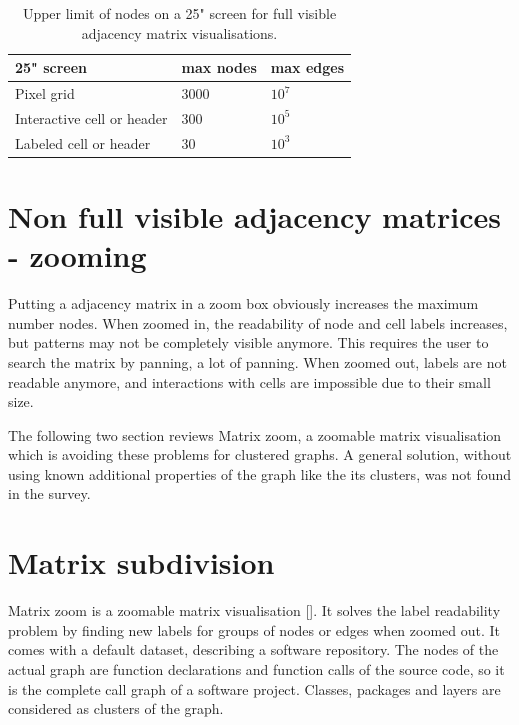  
\begin{table}[]
\centering
\begin{tabular}{|l|l|l|}
\hline
25" screen                 & max nodes & max edges                \\ \hline
Pixel grid                 & 3000      & $10^7$                     \\ \hline
Interactive cell or header & 300       & $10^5$                     \\ \hline
Labeled cell or header     & 30        & $10^3$                     \\ \hline
\end{tabular}
\caption{Upper limit of nodes on a 25" screen for full visible adjacency matrix visualisations.}
\label{my-label}
\end{table}



\section{Non full visible adjacency matrices - zooming}
Putting a adjacency matrix in a zoom box obviously increases the maximum number nodes. 
When zoomed in, the readability of node and cell labels increases, but patterns may not be completely visible anymore. This requires the user to search the matrix by panning, a lot of panning. When zoomed out, labels are not readable anymore, and interactions with cells are impossible due to their small size. 

The following two section reviews Matrix zoom, a zoomable matrix visualisation which is avoiding these problems for clustered graphs. A general solution, without using known additional properties of the graph like the its clusters, was not found in the survey.

\section{Matrix subdivision}

Matrix zoom is a zoomable matrix visualisation [\cite{ham-ivis-2003}]. It solves the label readability problem by finding new labels for groups of nodes or edges when zoomed out. It comes with a default dataset, describing a software repository. The nodes of the actual graph are function declarations and function calls of the source code, so it is the complete call graph of a software project. Classes, packages and layers are considered as clusters of the graph. 

